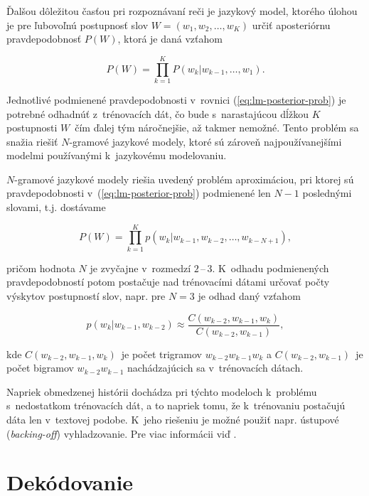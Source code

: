 Ďalšou dôležitou časťou pri rozpoznávaní reči je jazykový model, ktorého úlohou
je pre ľubovoľnú postupnosť slov $W = (w_1, w_2, \dots, w_K)$ určiť aposteriórnu pravdepodobnosť $P(W)$, ktorá je daná vzťahom

\begin{equation} \label{eq:lm-posterior-prob}
    P(W) = \prod_{k=1}^{K} P(w_k | w_{k-1}, \dots, w_1).
\end{equation}

\noindent Jednotlivé podmienené pravdepodobnosti v~rovnici (\ref{eq:lm-posterior-prob}) je potrebné odhadnúť z~trénovacích dát, čo bude s~narastajúcou dĺžkou $K$ postupnosti $W$ čím ďalej tým náročnejšie, až takmer nemožné. Tento problém sa snažia riešiť $N$-gramové jazykové modely, ktoré sú zároveň najpoužívanejšími modelmi používanými k~jazykovému modelovaniu.

$N$-gramové jazykové modely riešia uvedený problém aproximáciou, pri ktorej sú pravdepodobnosti v~(\ref{eq:lm-posterior-prob}) podmienené len $N-1$ poslednými slovami, t.j. dostávame 

\begin{equation} \label{eq:lm-posterior-prob2}
    P(W) = \prod_{k=1}^{K} p(w_k | w_{k-1}, w_{k-2}, \dots, w_{k-N+1}),
\end{equation}

\noindent pričom hodnota $N$ je zvyčajne v~rozmedzí $2$\,--\,$3$. K~odhadu podmienených pravdepodobností potom postačuje nad trénovacími dátami určovať počty výskytov postupností slov, napr. pre $N=3$ je odhad daný vzťahom

\begin{equation}
    p(w_k| w_{k-1}, w_{k-2}) \approx \frac{C(w_{k-2}, w_{k-1}, w_k)}{C(w_{k-2}, w_{k-1})},
\end{equation}

\noindent kde $C(w_{k-2}, w_{k-1}, w_k)$ je počet trigramov $w_{k-2} w_{k-1} w_k$ a $C(w_{k-2}, w_{k-1})$ je počet bigramov $w_{k-2} w_{k-1}$ nachádzajúcich sa v~trénovacích dátach.

Napriek obmedzenej histórii dochádza pri týchto modeloch k~problému s~nedostatkom trénovacích dát, a to napriek tomu, že k~trénovaniu postačujú dáta len v~textovej podobe. K~jeho riešeniu je možné použiť napr. ústupové (\textit{backing-off}) vyhladzovanie. Pre viac informácii viď \cite{Psutka2006}.


\section{Dekódovanie} \label{sec:decoding}

